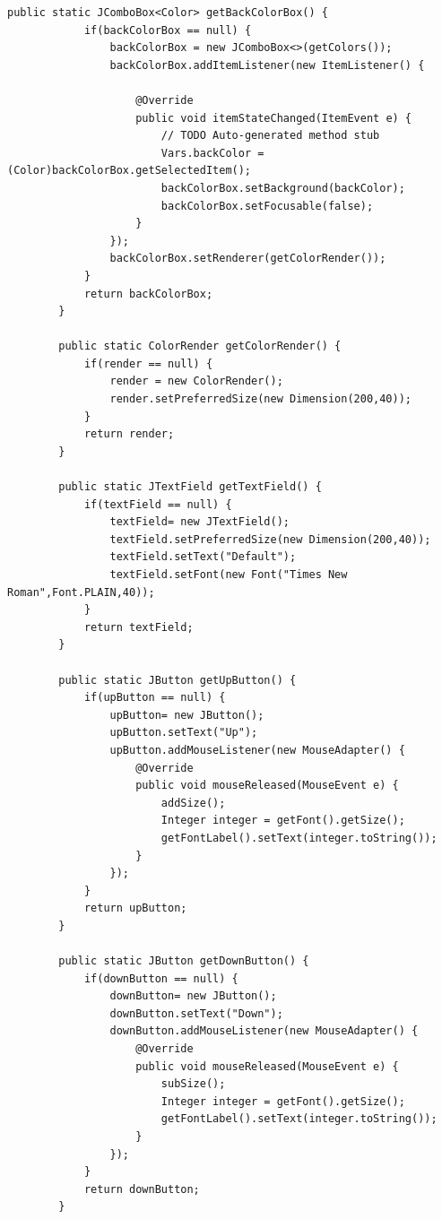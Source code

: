 \documentclass{ctexart}
\begin{document}
\begin{lstlisting}[caption = Vars.Java]
        public static JComboBox<Color> getBackColorBox() {
            if(backColorBox == null) {
                backColorBox = new JComboBox<>(getColors());
                backColorBox.addItemListener(new ItemListener() {
                    
                    @Override
                    public void itemStateChanged(ItemEvent e) {
                        // TODO Auto-generated method stub
                        Vars.backColor = (Color)backColorBox.getSelectedItem();
                        backColorBox.setBackground(backColor);
                        backColorBox.setFocusable(false);
                    }
                });
                backColorBox.setRenderer(getColorRender());
            }
            return backColorBox;
        }

        public static ColorRender getColorRender() {
            if(render == null) {
                render = new ColorRender();
                render.setPreferredSize(new Dimension(200,40));
            }
            return render;
        } 

        public static JTextField getTextField() {
            if(textField == null) {
                textField= new JTextField();
                textField.setPreferredSize(new Dimension(200,40));
                textField.setText("Default");
                textField.setFont(new Font("Times New Roman",Font.PLAIN,40));
            }
            return textField;
        }

        public static JButton getUpButton() {
            if(upButton == null) {
                upButton= new JButton();
                upButton.setText("Up");
                upButton.addMouseListener(new MouseAdapter() {
                    @Override
                    public void mouseReleased(MouseEvent e) {
                        addSize();
                        Integer integer = getFont().getSize();
                        getFontLabel().setText(integer.toString());
                    }
                });
            }
            return upButton;
        }

        public static JButton getDownButton() {
            if(downButton == null) {
                downButton= new JButton();
                downButton.setText("Down");
                downButton.addMouseListener(new MouseAdapter() {
                    @Override
                    public void mouseReleased(MouseEvent e) {
                        subSize();
                        Integer integer = getFont().getSize();
                        getFontLabel().setText(integer.toString());
                    }
                });
            }
            return downButton;
        }


\end{lstlisting}
\end{document}
